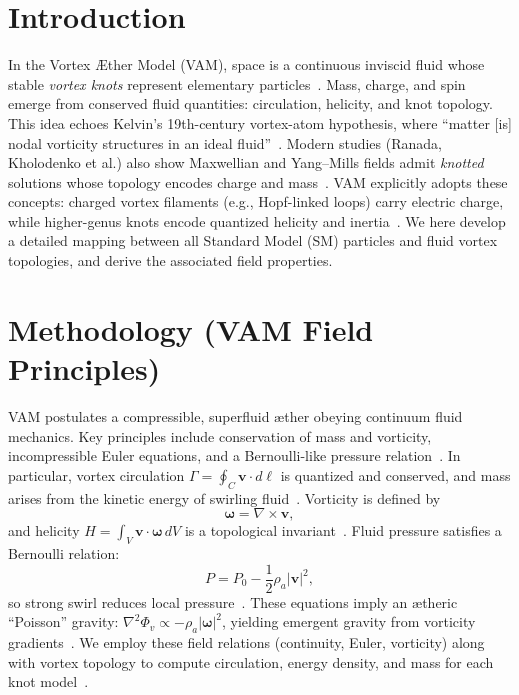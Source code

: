 \documentclass[a4paper,12pt]{article}
\begin{document}
\section*{Introduction}
In the Vortex \AE ther Model (VAM), space is a continuous inviscid fluid whose stable \textit{vortex knots} represent elementary particles~\cite{vam-lagrangian}. Mass, charge, and spin emerge from conserved fluid quantities: circulation, helicity, and knot topology. This idea echoes Kelvin's 19th-century vortex-atom hypothesis, where ``matter [is] nodal vorticity structures in an ideal fluid''~\cite{kelvin-vortex}. Modern studies (Ranada, Kholodenko et al.) also show Maxwellian and Yang--Mills fields admit \textit{knotted} solutions whose topology encodes charge and mass~\cite{kholodenko-knots}. VAM explicitly adopts these concepts: charged vortex filaments (e.g., Hopf-linked loops) carry electric charge, while higher-genus knots encode quantized helicity and inertia~\cite{kholodenko-knots,vam-lagrangian}. We here develop a detailed mapping between all Standard Model (SM) particles and fluid vortex topologies, and derive the associated field properties.

\section*{Methodology (VAM Field Principles)}
VAM postulates a compressible, superfluid \ae ther obeying continuum fluid mechanics. Key principles include conservation of mass and vorticity, incompressible Euler equations, and a Bernoulli-like pressure relation~\cite{vam-lagrangian}. In particular, vortex circulation $\Gamma=\oint_C\mathbf{v}\cdot d\boldsymbol{\ell}$ is quantized and conserved, and mass arises from the kinetic energy of swirling fluid~\cite{vam-lagrangian,helicity-appendix}. Vorticity is defined by
\[
\boldsymbol{\omega} = \nabla \times \mathbf{v},
\]
and helicity $H=\int_V \mathbf{v}\cdot\boldsymbol{\omega}\,dV$ is a topological invariant~\cite{helicity-appendix}. Fluid pressure satisfies a Bernoulli relation:
\[
P = P_0 - \frac{1}{2}\rho_a |\mathbf{v}|^2,
\]
so strong swirl reduces local pressure~\cite{vam-lagrangian}. These equations imply an \ae theric ``Poisson'' gravity: $\nabla^2\Phi_v \propto -\rho_a|\boldsymbol{\omega}|^2$, yielding emergent gravity from vorticity gradients~\cite{vam-lagrangian}. We employ these field relations (continuity, Euler, vorticity) along with vortex topology to compute circulation, energy density, and mass for each knot model~\cite{helicity-appendix,mass-appendix}.
\end{document}
